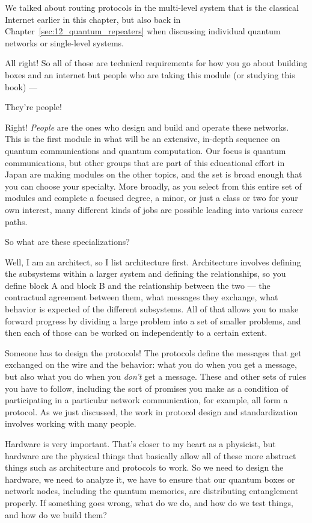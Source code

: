 \rrr We talked about routing protocols in the multi-level system that is the classical Internet earlier in this chapter, but also back in Chapter~\ref{sec:12_quantum_repeaters} when discussing individual quantum networks or single-level systems.

All right! So all of those are technical requirements for how you go about building boxes and an internet but people who are taking this module (or studying this book) ---

\mmm They're people! 

\rrr Right! \emph{People} are the ones who design and build and operate these networks. This is the first module in what will be an extensive, in-depth sequence on quantum communications and quantum computation.  Our focus is quantum communications, but other groups that are part of this educational effort in Japan are making modules on the other topics, and the set is broad enough that you can choose your specialty. More broadly, as you select from this entire set of modules and complete a focused degree, a minor, or just a class or two for your own interest, many different kinds of jobs are possible leading into various career paths.

\mmm So what are these specializations?

\rrr Well, I am an architect, so I list architecture first. Architecture involves defining the subsystems within a larger system and defining the relationships, so you define block A and block B and the relationship between the two --- the contractual agreement between them, what messages they exchange, what behavior is expected of the different subsystems. All of that allows you to make forward progress by dividing a large problem into a set of smaller problems, and then each of those can be worked on independently to a certain extent.

Someone has to design the protocols! The protocols define the messages that get exchanged on the wire and the behavior: what you do when you get a message, but also what you do when you \emph{don't} get a message. These and other sets of rules you have to follow, including the sort of promises you make as a condition of participating in a particular network communication, for example, all form a protocol.  As we just discussed, the work in protocol design and standardization involves working with many people.

\mmm Hardware is very important. That's closer to my heart as a physicist, but hardware are the physical things that basically allow all of these more abstract things such as architecture and protocols to work. So we need to design the hardware, we need to analyze it, we have to ensure that our quantum boxes or network nodes, including the quantum memories, are distributing entanglement properly. If something goes wrong, what do we do, and how do we test things, and how do we build them?

